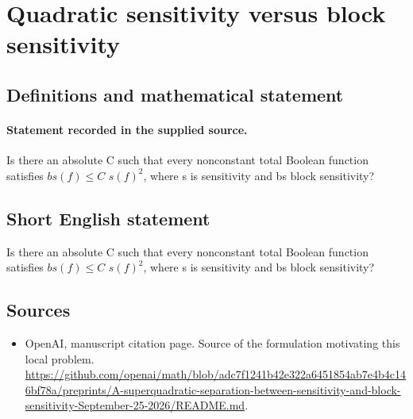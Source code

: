 \documentclass[11pt]{article}
\begin{document}
\section*{Quadratic sensitivity versus block sensitivity}\label{statement}
\subsection{Definitions and mathematical statement}
\paragraph{Statement recorded in the supplied source.}
Is there an absolute C such that every nonconstant total Boolean function satisfies $bs(f)\leq C$ $s(f)^{2}$, where s is sensitivity and bs block sensitivity?
\subsection{Short English statement}
Is there an absolute C such that every nonconstant total Boolean function satisfies $bs(f)\leq C$ $s(f)^{2}$, where s is sensitivity and bs block sensitivity?
\subsection{Sources}
\begin{itemize}
\item[S1] OpenAI, manuscript citation page. Source of the formulation motivating this local problem.
\url{https://github.com/openai/math/blob/adc7f1241b42e322a6451854ab7e4b4c146bf78a/preprints/A-superquadratic-separation-between-sensitivity-and-block-sensitivity-September-25-2026/README.md}.
\end{itemize}
\end{document}
